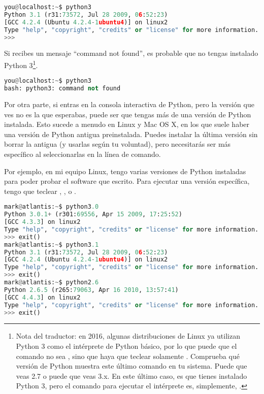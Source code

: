 \begin{lstlisting}[language=Python,breaklines=true,mathescape=false]
you@localhost:~$ python3
Python 3.1 (r31:73572, Jul 28 2009, 06:52:23)
[GCC 4.2.4 (Ubuntu 4.2.4-1ubuntu4)] on linux2
Type "help", "copyright", "credits" or "license" for more information.
>>>
\end{lstlisting}


Si recibes un mensaje ``command not found'', es probable que no tengas instalado Python 3\footnote{Nota del traductor: en 2016, algunas distribuciones de Linux ya utilizan Python 3 como el intérprete de Python básico, por lo que puede que el comando no sea , sino que haya que teclear solamente . Comprueba qué versión de Python muestra este último comando en tu sistema. Puede que veas 2.7 o puede que veas 3.x. En este último caso, es que tienes instalado Python 3, pero el comando para ejecutar el intérprete es, simplemente, .}.


\begin{lstlisting}[language=Python,breaklines=true,mathescape=false]
you@localhost:~$ python3
bash: python3: command not found
\end{lstlisting}

Por otra parte, si entras en la consola interactiva de Python, pero la versión que ves no es la que esperabas, puede ser que tengas más de una versión de Python instalada. Esto sucede a menudo en Linux y Mac OS X, en los que suele haber una versión de Python antigua preinstalada. Puedes instalar la última versión sin borrar la antigua (y usarlas según tu voluntad), pero necesitarás ser más específico al seleccionarlas en la línea de comando.

Por ejemplo, en mi equipo Linux, tengo varias versiones de Python instaladas para poder probar el software que escrito. Para ejecutar una versión específica, tengo que teclear , , o .


\begin{lstlisting}[language=Python,breaklines=true,mathescape=false]
mark@atlantis:~$ python3.0
Python 3.0.1+ (r301:69556, Apr 15 2009, 17:25:52)
[GCC 4.3.3] on linux2
Type "help", "copyright", "credits" or "license" for more information.
>>> exit()
mark@atlantis:~$ python3.1
Python 3.1 (r31:73572, Jul 28 2009, 06:52:23) 
[GCC 4.2.4 (Ubuntu 4.2.4-1ubuntu4)] on linux2
Type "help", "copyright", "credits" or "license" for more information.
>>> exit()
mark@atlantis:~$ python2.6
Python 2.6.5 (r265:79063, Apr 16 2010, 13:57:41) 
[GCC 4.4.3] on linux2
Type "help", "copyright", "credits" or "license" for more information.
>>> exit()
\end{lstlisting}

